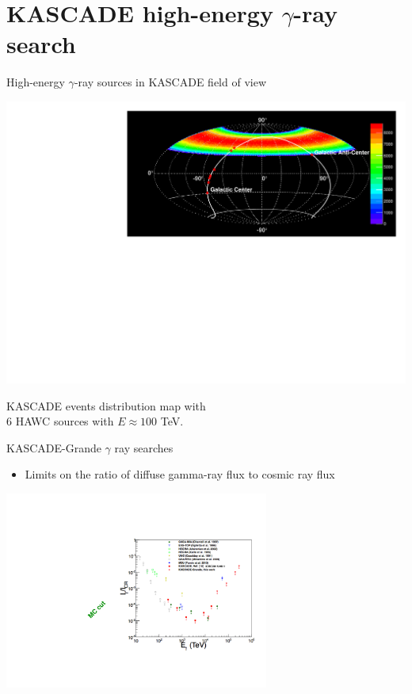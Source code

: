 \section{KASCADE high-energy \texorpdfstring{$\gamma$}{gamma}-ray search}

\begin{frame}{High-energy $\gamma$-ray sources in KASCADE field of view}
  
  \begin{center}
    \includegraphics[width=1\textwidth]{pics/Skymap_6srcs.pdf}
    
 KASCADE events distribution map
  with\\ 6 HAWC sources with $E \approx 100$ TeV.
\end{center}
\end{frame}

\begin{frame}{KASCADE-Grande $\gamma$ ray searches}
\begin{itemize}
 \item Limits on the ratio of diffuse gamma-ray flux to cosmic ray flux
\end{itemize}

\begin{center}
    \includegraphics[width=0.65\textwidth]{pics/KASCADE-Grande_UHECR2016.pdf}
\end{center}
\end{frame}


